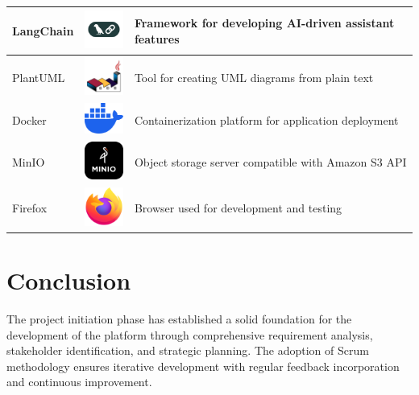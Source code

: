 \begin{longtable}{|m{3.5cm}|m{4cm}|m{6.5cm}|}
    \hline
    LangChain & \includegraphics[width=1.5cm]{pictures/web/logo/langchain-icon-seeklogo.png} & Framework for developing AI-driven assistant features \\
    \hline
    PlantUML & \includegraphics[width=1.5cm]{pictures/web/logo/plantuml-svgrepo-com.png} & Tool for creating UML diagrams from plain text \\
    \hline
    Docker & \includegraphics[width=1.5cm]{pictures/web/logo/docker.png} & Containerization platform for application deployment \\
    \hline
    MinIO & \includegraphics[width=1.5cm]{pictures/web/logo/minio.png} & Object storage server compatible with Amazon S3 API \\
    \hline
    Firefox & \includegraphics[width=1.5cm]{pictures/web/logo/firefox.png} & Browser used for development and testing \\
    \hline
    \end{longtable}
       
    

\section{Conclusion}

The project initiation phase has established a solid foundation for the development of the platform through comprehensive requirement analysis, stakeholder identification, and strategic planning. The adoption of Scrum methodology ensures iterative development with regular feedback incorporation and continuous improvement.

